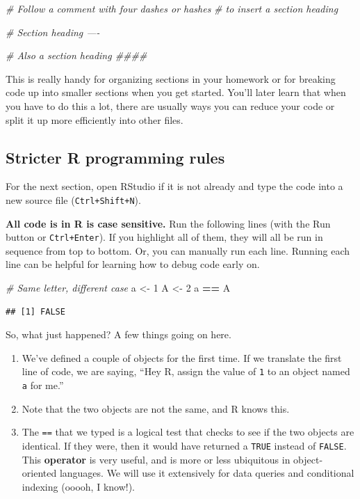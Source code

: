 \documentclass[
]{book}
\newenvironment{Shaded}{\begin{snugshade}}{\end{snugshade}}
\newcommand{\CommentTok}[1]{\textcolor[rgb]{0.56,0.35,0.01}{\textit{#1}}}
\newcommand{\DecValTok}[1]{\textcolor[rgb]{0.00,0.00,0.81}{#1}}
\newcommand{\NormalTok}[1]{#1}
\newcommand{\OperatorTok}[1]{\textcolor[rgb]{0.81,0.36,0.00}{\textbf{#1}}}
\newcommand{\StringTok}[1]{\textcolor[rgb]{0.31,0.60,0.02}{#1}}
\begin{document}
\begin{Shaded}
\begin{Highlighting}[]
\CommentTok{# Follow a comment with four dashes or hashes}
\CommentTok{# to insert a section heading}

\CommentTok{# Section heading ----}

\CommentTok{# Also a section heading ####}
\end{Highlighting}
\end{Shaded}

This is really handy for organizing sections in your homework or for breaking code up into smaller sections when you get started. You'll later learn that when you have to do this a lot, there are usually ways you can reduce your code or split it up more efficiently into other files.

\hypertarget{rules}{%
\subsection*{Stricter R programming rules}\label{rules}}

For the next section, open RStudio if it is not already and type the code into a new source file (\texttt{Ctrl+Shift+N}).

\textbf{All code is in R is case sensitive.}
Run the following lines (with the Run button or \texttt{Ctrl+Enter}). If you highlight all of them, they will all be run in sequence from top to bottom. Or, you can manually run each line. Running each line can be helpful for learning how to debug code early on.

\begin{Shaded}
\begin{Highlighting}[]
\CommentTok{# Same letter, different case}
\NormalTok{a <-}\StringTok{ }\DecValTok{1}
\NormalTok{A <-}\StringTok{ }\DecValTok{2}
\NormalTok{a }\OperatorTok{==}\StringTok{ }\NormalTok{A}
\end{Highlighting}
\end{Shaded}

\begin{verbatim}
## [1] FALSE
\end{verbatim}

So, what just happened? A few things going on here.

\begin{enumerate}
\def\labelenumi{\arabic{enumi}.}
\item
  We've defined a couple of objects for the first time. If we translate the first line of code, we are saying, ``Hey R, assign the value of \texttt{1} to an object named \texttt{a} for me.''
\item
  Note that the two objects are not the same, and R knows this.
\item
  The \texttt{==} that we typed is a logical test that checks to see if the two objects are identical. If they were, then it would have returned a \texttt{TRUE} instead of \texttt{FALSE}. This \textbf{operator} is very useful, and is more or less ubiquitous in object-oriented languages. We will use it extensively for data queries and conditional indexing (ooooh, I know!).
\end{enumerate}
\end{document}
